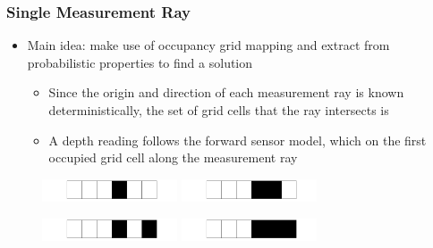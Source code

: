 \documentclass[11pt,professionalfonts,hyperref={pdftex,pdfpagemode=none,pdfstartview=FitH}]{beamer}
\renewcommand{\emph}[1]{\textit{\textbf{\color{blue}{#1}}}}
\begin{document}
\begin{frame}
\frametitle{Single Measurement Ray}

\begin{itemize}
    \item Main idea: make use of occupancy grid mapping \emph{assumptions} and extract \emph{patterns} from probabilistic properties to find a \emph{computationally-efficient} solution
	\begin{itemize}
		\item Since the origin and direction of each measurement ray is known deterministically, the set of grid cells that the ray intersects is \emph{known through geometry}
		\item A depth reading follows the forward sensor model, which \emph{only depends} on the first occupied grid cell along the measurement ray
	\end{itemize}
\end{itemize}

\begin{figure}[!htbp]
\vspace*{-0.25cm}
\centerline{
	\includegraphics[width=4.0cm]{rkplus_1.png}\hspace*{-0.5cm}
	\includegraphics[width=4.0cm]{rkplus_2.png}}
 \centerline{
	\includegraphics[width=4.0cm]{rkplus_3.png}\hspace*{-0.5cm}
	\includegraphics[width=4.0cm]{rkplus_4.png}}
\end{figure}

\end{frame}
\end{document}
